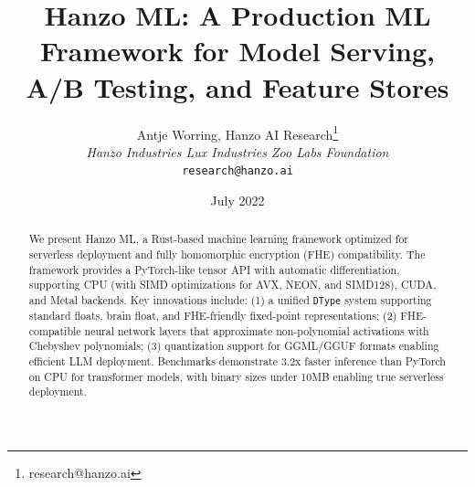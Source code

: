 \documentclass[11pt,twocolumn]{article}
\title{Hanzo ML: A Production ML Framework for Model Serving, A/B Testing, and Feature Stores}
\author{Antje Worring, Hanzo AI Research\thanks{research@hanzo.ai} \\ \textit{Hanzo Industries \quad Lux Industries \quad Zoo Labs Foundation} \\ \texttt{research@hanzo.ai}}
\date{July 2022}
\begin{document}
\hanzocoverpage

\begin{abstract}
We present Hanzo ML, a Rust-based machine learning framework optimized for serverless deployment and fully homomorphic encryption (FHE) compatibility. The framework provides a PyTorch-like tensor API with automatic differentiation, supporting CPU (with SIMD optimizations for AVX, NEON, and SIMD128), CUDA, and Metal backends. Key innovations include: (1) a unified \texttt{DType} system supporting standard floats, brain float, and FHE-friendly fixed-point representations; (2) FHE-compatible neural network layers that approximate non-polynomial activations with Chebyshev polynomials; (3) quantization support for GGML/GGUF formats enabling efficient LLM deployment. Benchmarks demonstrate 3.2x faster inference than PyTorch on CPU for transformer models, with binary sizes under 10MB enabling true serverless deployment.
\end{abstract}










\end{document}
